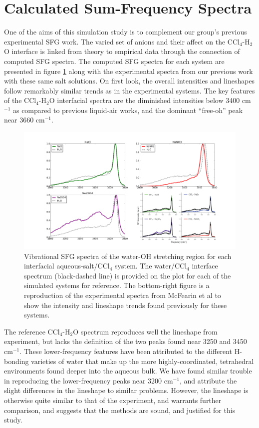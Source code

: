 \section{Calculated Sum-Frequency Spectra}

One of the aims of this simulation study is to complement our group's previous experimental SFG work.\cite{McFearin2009} The varied set of anions and their affect on the CCl$_4$-H$_2$O interface is linked from theory to empirical data through the connection of computed SFG spectra. The computed SFG spectra for each system are presented in figure \ref{fig:sfg-spectra} along with the experimental spectra from our previous work with these same salt solutions.\cite{McFearin2009} On first look, the overall intensities and lineshapes follow remarkably similar trends as in the experimental systems. The key features of the CCl$_4$-H$_2$O interfacial spectra are the diminished intensities below 3400 cm$^{-1}$ as compared to previous liquid-air works, and the dominant ``free-oh'' peak near 3660 cm$^{-1}$.

\begin{figure}[h!]
\begin{center}
	\includegraphics[scale=1.0]{images/sfg-spectra.png}
	\caption{Vibrational SFG spectra of the water-OH stretching region for each interfacial aqueous-salt/CCl$_4$ system. The water/CCl$_4$ interface spectrum (black-dashed line) is provided on the plot for each of the simulated systems for reference. The bottom-right figure is a reproduction of the experimental spectra from McFearin et al to show the intensity and lineshape trends found previously for these systems.\cite{McFearin2009}}
	\label{fig:sfg-spectra}
\end{center}
\end{figure}

The reference CCl$_4$-H$_2$O spectrum reproduces well the lineshape from experiment, but lacks the definition of the two peaks found near 3250 and 3450 cm$^{-1}$. These lower-frequency features have been attributed to the different H-bonding varieties of water that make up the more highly-coordinated, tetrahedral environments found deeper into the aqueous bulk. We have found similar trouble in reproducing the lower-frequency peaks near 3200 cm$^{-1}$, and attribute the slight differences in the lineshape to similar problems.\cite{Walker2006b} However, the lineshape is otherwise quite similar to that of the experiment, and warrants further comparison, and suggests that the methods are sound, and justified for this study.

